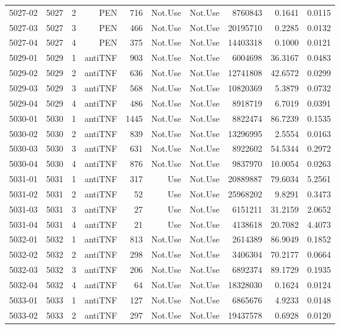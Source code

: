 {\begin{longtable}{ | r | r | r | r | r | r | r | r | r | r | }
5027-02 & 5027 & 2 & PEN & 716 & Not.Use & Not.Use & 8760843 & 0.1641 & 0.0115\\ 
5027-03 & 5027 & 3 & PEN & 466 & Not.Use & Not.Use & 20195710 & 0.2285 & 0.0132\\ 
5027-04 & 5027 & 4 & PEN & 375 & Not.Use & Not.Use & 14403318 & 0.1000 & 0.0121\\ 
5029-01 & 5029 & 1 & antiTNF & 903 & Not.Use & Not.Use & 6004698 & 36.3167 & 0.0483\\ 
5029-02 & 5029 & 2 & antiTNF & 636 & Not.Use & Not.Use & 12741808 & 42.6572 & 0.0299\\ 
5029-03 & 5029 & 3 & antiTNF & 568 & Not.Use & Not.Use & 10820369 & 5.3879 & 0.0732\\ 
5029-04 & 5029 & 4 & antiTNF & 486 & Not.Use & Not.Use & 8918719 & 6.7019 & 0.0391\\ 
5030-01 & 5030 & 1 & antiTNF & 1445 & Not.Use & Not.Use & 8822474 & 86.7239 & 0.1535\\ 
5030-02 & 5030 & 2 & antiTNF & 839 & Not.Use & Not.Use & 13296995 & 2.5554 & 0.0163\\ 
5030-03 & 5030 & 3 & antiTNF & 631 & Not.Use & Not.Use & 8922602 & 54.5344 & 0.2972\\ 
5030-04 & 5030 & 4 & antiTNF & 876 & Not.Use & Not.Use & 9837970 & 10.0054 & 0.0263\\ 
5031-01 & 5031 & 1 & antiTNF & 317 & Use & Not.Use & 20889887 & 79.6034 & 5.2561\\ 
5031-02 & 5031 & 2 & antiTNF & 52 & Use & Not.Use & 25968202 & 9.8291 & 0.3473\\ 
5031-03 & 5031 & 3 & antiTNF & 27 & Use & Not.Use & 6151211 & 31.2159 & 2.0652\\ 
5031-04 & 5031 & 4 & antiTNF & 21 & Use & Not.Use & 4138618 & 20.7082 & 4.4073\\ 
5032-01 & 5032 & 1 & antiTNF & 813 & Not.Use & Not.Use & 2614389 & 86.9049 & 0.1852\\ 
5032-02 & 5032 & 2 & antiTNF & 298 & Not.Use & Not.Use & 3406304 & 70.2177 & 0.0664\\ 
5032-03 & 5032 & 3 & antiTNF & 206 & Not.Use & Not.Use & 6892374 & 89.1729 & 0.1935\\ 
5032-04 & 5032 & 4 & antiTNF & 64 & Not.Use & Not.Use & 18328030 & 0.1624 & 0.0124\\ 
5033-01 & 5033 & 1 & antiTNF & 127 & Not.Use & Not.Use & 6865676 & 4.9233 & 0.0148\\ 
5033-02 & 5033 & 2 & antiTNF & 297 & Not.Use & Not.Use & 19437578 & 0.6928 & 0.0120\\ 

\end{longtable}}
